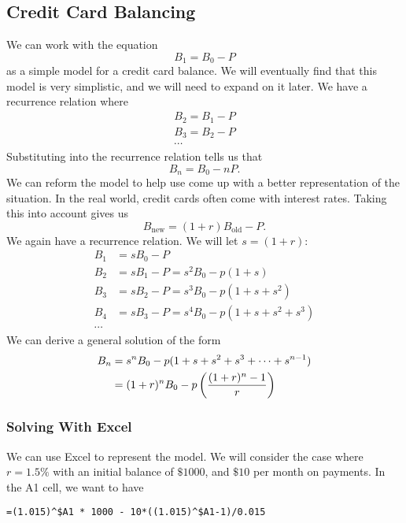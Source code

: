 \documentclass{hw}
\begin{document}
\subsection{Credit Card Balancing}
We can work with the equation
\[
B_{1} = B_{0} - P
\]
as a simple model for a credit card balance. We will eventually find that this model is very
simplistic, and we will need to expand on it later. We have a recurrence relation where
\begin{gather*}
B_{2} = B_{1} - P\\
B_{3} = B_{2} - P\\
\cdots
\end{gather*}
Substituting into the recurrence relation tells us that
\[
B_{n} = B_{0} - nP.
\]
We can reform the model to help use come up with a better representation of the situation.
In the real world, credit cards often come with interest rates. Taking this into account
gives us
\[
B_{\text{new}} = (1+r)B_{\text{old}} - P.
\]
We again have a recurrence relation. We will let $s = (1+r)$:
\begin{align*}
B_{1} &= sB_{0} - P\\
B_{2} &= sB_{1} - P = s^{2}B_{0}-p(1+s)\\
B_{3} &= sB_{2} - P = s^{3}B_{0}-p(1+s+s^{2})\\
B_{4} &= sB_{3} - P = s^{4}B_{0}-p(1+s+s^{2}+s^{3})\\
\cdots
\end{align*}
We can derive a general solution of the form
\begin{align*}
B_{n} &= s^{n}B_{0}-p(1 + s + s^{2} + s^{3} + \cdots + s^{n-1})\\
&= (1+r)^{n}B_{0}-p\left({(1+r)^{n} - 1\over r}\right)
\end{align*}
\subsubsection{Solving With Excel}
We can use Excel to represent the model. We will consider the case where $r=1.5\%$ with an initial
balance of $\$1000$, and $\$10$ per month on payments. In the A1 cell, we want to have
\begin{verbatim}
=(1.015)^$A1 * 1000 - 10*((1.015)^$A1-1)/0.015
\end{verbatim}
\end{document}
